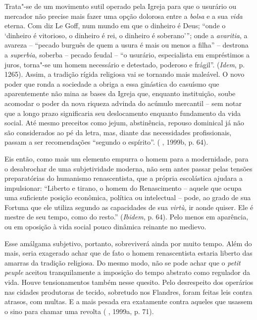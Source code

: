 Trata"-se de um movimento sutil operado pela Igreja para que o usurário
ou mercador não precise mais fazer uma opção dolorosa entre a
\emph{bolsa} e a sua \emph{vida} eterna. Com diz
Le Goff, num mundo em que o dinheiro é Deus; ``onde o `dinheiro é
vitorioso, o dinheiro é rei, o dinheiro é soberano'''; onde a
\emph{avaritia}, a avareza -- ``pecado burguês de quem a usura é mais ou
menos a filha'' -- destrona a \emph{superbia}, soberba -- pecado feudal
-- ``o usurário, especialista em empréstimos a juros, torna"-se um homem
necessário e detestado, poderoso e frágil''. (\emph{Idem}, p. 1265).
Assim, a tradição rígida religiosa vai se tornando mais maleável. O novo
poder que ronda a sociedade a obriga a essa ginástica do casuísmo que
aparentemente não mina as bases da Igreja que, enquanto instituição,
soube acomodar o poder da nova riqueza advinda do acúmulo mercantil --
sem notar que a longo prazo significaria seu deslocamento enquanto
fundamento da vida social. Até mesmo preceitos como jejum, abstinência,
repouso dominical já não são considerados ao pé da letra, mas, diante
das necessidades profissionais, passam a ser recomendações ``segundo o
espírito''. ( , 1999b, p. 64).

Eis então, como mais um elemento empurra o homem para a modernidade,
para o desabrochar de uma subjetividade moderna, não sem antes passar
pelas tensões preparatórias do humanismo renascentista, que a própria
escolástica ajudara a impulsionar: ``Liberto e tirano, o homem do
Renascimento -- aquele que ocupa uma suficiente posição econômica,
política ou intelectual -- pode, ao grado de sua Fortuna que ele utiliza
segundo as capacidades de sua \emph{virtù,} ir aonde quiser. Ele é
mestre de seu tempo, como do resto.'' (\emph{Ibidem}, p. 64). Pelo menos
em aparência, ou em oposição à vida social pouco dinâmica reinante no
medievo.

Esse amálgama subjetivo, portanto, sobreviverá ainda por muito tempo.
Além do mais, seria exagerado achar que de fato o homem renascentista
estaria liberto das amarras da tradição religiosa. Do mesmo modo, não
se pode achar que o \emph{petit peuple} aceitou tranquilamente a
imposição do tempo abstrato como regulador da vida. Houve tensionamentos
também nesse quesito. Pelo desrespeito dos operários nas cidades
produtoras de tecido, sobretudo nos Flandres, foram feitas leis contra
atrasos, com multas. E a mais pesada era exatamente contra aqueles que
usassem o sino para chamar uma revolta ( , 1999a, p. 71).

